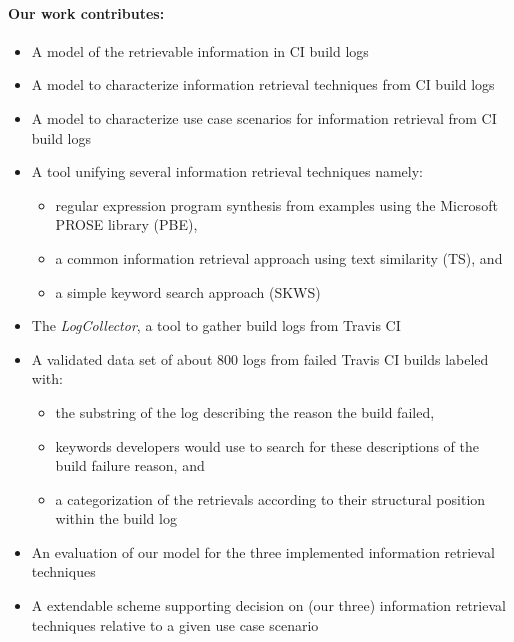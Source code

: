 \documentclass[\myrootdir/main.tex]{subfiles}
\begin{document}
\paragraph{Our work contributes:}
\begin{itemize}
  \item A model of the retrievable information in CI build logs
  \item A model to characterize information retrieval techniques from CI build logs
  \item A model to characterize use case scenarios for information retrieval from CI build logs
  \item A tool unifying several information retrieval techniques namely:
        \begin{itemize}
          \item regular expression program synthesis from examples using the Microsoft PROSE library (PBE),
          \item a common information retrieval approach using text similarity (TS), and
          \item a simple keyword search approach (SKWS)
        \end{itemize}
  \item The \emph{LogCollector}, a tool to gather build logs from Travis CI
  \item A validated data set of about 800 logs from failed Travis CI builds labeled with:
        \begin{itemize}
          \item the substring of the log describing the reason the build failed,
          \item keywords developers would use to search for these descriptions of the build failure reason, and
          \item a categorization of the retrievals according to their structural position within the build log
        \end{itemize}
  \item An evaluation of our model for the three implemented information retrieval techniques 
  \item A extendable scheme supporting decision on (our three) information retrieval techniques relative to a given use case scenario
\end{itemize}
\end{document}
